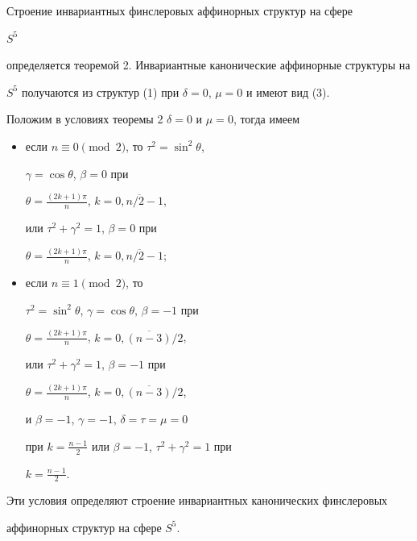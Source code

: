 \begin{pf} Строение инвариантных финслеровых аффинорных структур на сфере 


$S^5$ 


определяется теоремой 2. Инвариантные канонические аффинорные структуры на 


$S^5$ получаются из структур (1) при $\delta=0$, $\mu=0$ и имеют вид (3). 


Положим в условиях теоремы 2 $\delta=0$ и $\mu=0$, тогда имеем 


\begin{itemize} 


\item[1)] если $n\equiv0\pmod{2}$, то $\tau^2=\sin^2\theta$, 


$\gamma=\cos\theta$, $\beta=0$ при 


$\theta=\frac{(2k+1)\pi}{n}$, $k=\overline{0,n/2-1}$, 


или $\tau^2+\gamma^2=1$, $\beta=0$ при 


$\theta=\frac{(2k+1)\pi}{n}$, $k=\overline{0,n/2-1}$; 


\item[2)] если $n\equiv1\pmod{2}$, то 


$\tau^2=\sin^2\theta$, $\gamma=\cos\theta$, $\beta=-1$ при 


$\theta=\frac{(2k+1)\pi}{n}$, $k=\overline{0,(n-3)/2}$, 


или $\tau^2+\gamma^2=1$, $\beta=-1$ при 


$\theta=\frac{(2k+1)\pi}{n}$, $k=\overline{0,(n-3)/2}$, 


и $\beta=-1$, $\gamma=-1$, $\delta=\tau=\mu=0$


при $k=\frac{n-1}{2}$ или $\beta=-1$, $\tau^2+\gamma^2=1$ при 


$k=\frac{n-1}{2}$. 


\end{itemize}


Эти условия определяют строение инвариантных канонических финслеровых 


аффинорных структур на сфере $S^5$. 


\end{pf} 


 


